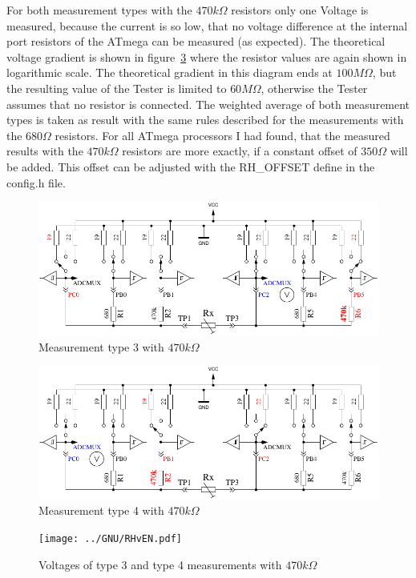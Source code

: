 For both measurement types with the \(470k\Omega\) resistors only one Voltage is measured, because the current
is so low, that no voltage difference at the internal port resistors of the ATmega can be measured (as expected).
The theoretical voltage gradient is shown in figure~\ref{fig:RHv} where the resistor values are again shown in logarithmic scale.
The theoretical gradient in this diagram ends at \(100M\Omega\), but the resulting value of the Tester is
limited to \(60M\Omega\), otherwise the Tester assumes that no resistor is connected.
The weighted average of both measurement types is taken as result with the same rules described for the measurements with the \(680\Omega\) resistors.
For all ATmega processors I had found, that the measured results with the \(470k\Omega\) resistors are more exactly,
if a constant offset of \(350\Omega\) will be added.
This offset can be adjusted with the RH\_OFFSET define in the config.h file.

\begin{figure}[H]
\centering
\includegraphics[width=.8\textwidth]{../FIG/ResistormessH1.pdf}
\caption{Measurement type 3 with \(470k\Omega\) }
\label{fig:RH1mes}
\end{figure}

\begin{figure}[H]
 \centering
 \includegraphics[width=.8\textwidth]{../FIG/ResistormessH2.pdf}
 \caption{Measurement type 4 with \(470k\Omega\) }
\label{fig:RH2mes}
\end{figure}

\begin{figure}[H]
\centering
\texttt{[image: ../GNU/RHvEN.pdf]}
\caption{Voltages of type 3 and type 4 measurements with \(470k\Omega\) }
\label{fig:RHv}
\end{figure}

